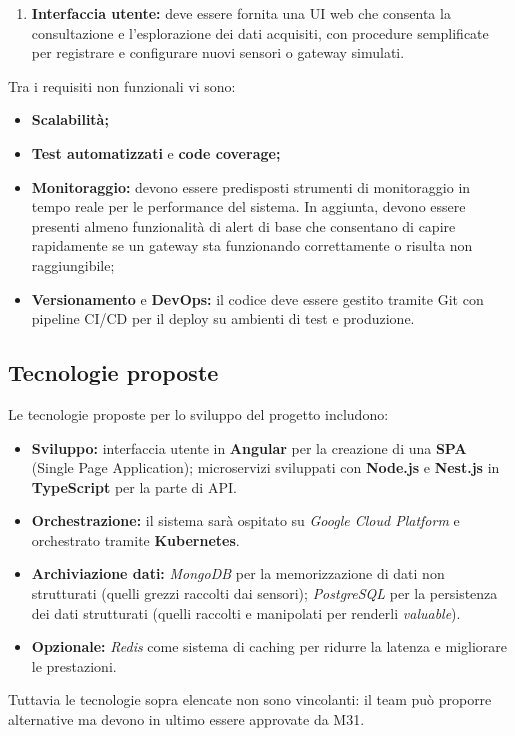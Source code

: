 \documentclass[a4paper,11pt]{article}
\begin{document}
\begin{enumerate}[noitemsep, topsep=0pt]
  \item \textbf{Interfaccia utente:} deve essere fornita una UI web che consenta la consultazione e l’esplorazione dei dati acquisiti, 
  con procedure semplificate per registrare e configurare nuovi sensori o gateway simulati.
\end{enumerate}
Tra i requisiti non funzionali vi sono: 
\begin{itemize}[noitemsep, topsep=0pt]
  \item \textbf{Scalabilità;}
  \item \textbf{Test automatizzati} e \textbf{code coverage;}
  \item \textbf{Monitoraggio:} devono essere predisposti strumenti di monitoraggio in tempo reale per le performance del sistema. 
  In aggiunta, devono essere presenti almeno funzionalità di alert di base che consentano di capire rapidamente 
  se un gateway sta funzionando correttamente o risulta non raggiungibile;
  \item \textbf{Versionamento} e \textbf{DevOps:} il codice deve essere gestito tramite Git con pipeline CI/CD 
  per il deploy su ambienti di test e produzione.
\end{itemize}

\subsection{Tecnologie proposte}
Le tecnologie proposte per lo sviluppo del progetto includono:
\begin{itemize}[noitemsep, topsep=0pt]
  \item \textbf{Sviluppo:} 
  interfaccia utente in \textbf{Angular} per la creazione di una \textbf{SPA} (Single Page Application); 
  microservizi sviluppati con \textbf{Node.js} e \textbf{Nest.js} in \textbf{TypeScript} per la parte di API.
  
  \item \textbf{Orchestrazione:} 
  il sistema sarà ospitato su \textit{Google Cloud Platform} e orchestrato tramite \textbf{Kubernetes}.
  
  \item \textbf{Archiviazione dati:} 
  \textit{MongoDB} per la memorizzazione di dati non strutturati (quelli grezzi raccolti dai sensori); 
  \textit{PostgreSQL} per la persistenza dei dati strutturati (quelli raccolti e manipolati per renderli \textit{valuable}).
  
  \item \textbf{Opzionale:} 
  \textit{Redis} come sistema di caching per ridurre la latenza e migliorare le prestazioni.
\end{itemize}
Tuttavia le tecnologie sopra elencate non sono vincolanti: il team può proporre alternative ma devono in ultimo essere approvate da M31.
\end{document}
